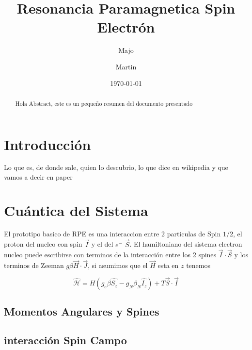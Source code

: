 \documentclass[twocolumn,amssymb,prb,aps,superscriptaddress]{revtex4}
\begin{document}
\begin{abstract}
    Hola Abstract, este es un pequeño resumen del documento presentado
\end{abstract}

\title{Resonancia Paramagnetica Spin Electrón}
\author{Majo}


\author{Martin}


\date{\today}

\maketitle

\section[Intro]{Introducción}
\label{sec:intro}

Lo que es, de donde sale, quien lo descubrio, lo que dice en wikipedia y que vamos a decir en paper

\section[]{Cuántica del Sistema}
\label{sec:cuantica}
El prototipo basico de RPE es una interaccion entre 2 particulas de Spin $1/2$, el proton del nucleo con spin $\vec{I}$ y el del $e^-$ $\vec{S}$. El hamiltoniano del sistema electron nucleo puede escribirse con terminos de la interacción entre los 2 spines $ \vec{I} \cdot \vec{S} $ y los terminos de Zeeman $g \beta \vec{H} \cdot \vec{J}$, si asumimos que el $\vec{H}$ esta en $z$ tenemos

\begin{equation}
    \label{eq:hamiltonianoDelSistema}
    \mathcal{\hat{H}} = H (g_e \beta \hat{S_z} - g_N \beta_N \hat{I_z}) + T \vec{S} \cdot \vec{I} 
\end{equation}

\subsection{Momentos Angulares y Spines}
\label{sec:momentosAngulares}

\subsection{interacción Spin Campo}
\end{document}
